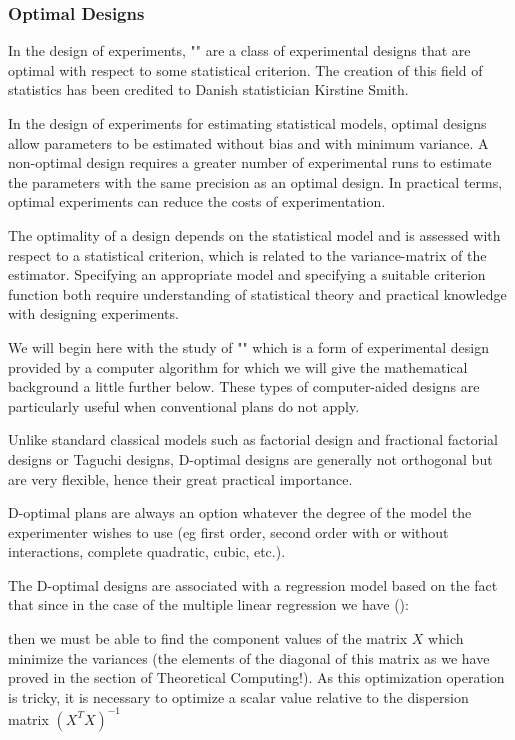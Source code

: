 	\pagebreak
	\subsubsection{Optimal Designs}
	In the design of experiments, "" are a class of experimental designs that are optimal with respect to some statistical criterion. The creation of this field of statistics has been credited to Danish statistician Kirstine Smith.

	In the design of experiments for estimating statistical models, optimal designs allow parameters to be estimated without bias and with minimum variance. A non-optimal design requires a greater number of experimental runs to estimate the parameters with the same precision as an optimal design. In practical terms, optimal experiments can reduce the costs of experimentation.
	
	The optimality of a design depends on the statistical model and is assessed with respect to a statistical criterion, which is related to the variance-matrix of the estimator. Specifying an appropriate model and specifying a suitable criterion function both require understanding of statistical theory and practical knowledge with designing experiments.

	We will begin here with the study of "" which is a form of experimental design provided by a computer algorithm for which we will give the mathematical background a little further below. These types of computer-aided designs are particularly useful when conventional plans do not apply.

	Unlike standard classical models such as factorial design and fractional factorial designs or Taguchi designs, D-optimal designs are generally not orthogonal but are very flexible, hence their great practical importance.

	D-optimal plans are always an option whatever the degree of the model the experimenter wishes to use (eg first order, second order with or without interactions, complete quadratic, cubic, etc.).

	The D-optimal designs are associated with a regression model based on the fact that since in the case of the multiple linear regression we have ():
	
 	then we must be able to find the component values of the matrix $X$ which minimize the variances (the elements of the diagonal of this matrix as we have proved in the section of Theoretical Computing!). As this optimization operation is tricky, it is necessary to optimize a scalar value relative to the dispersion matrix $(X^TX)^{-1}$

